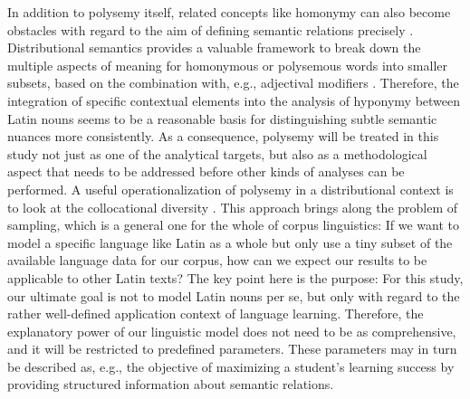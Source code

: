 \documentclass[runningheads]{llncs}
\begin{document}
In addition to polysemy itself, related concepts like homonymy can also become obstacles with regard to the aim of defining semantic relations precisely \parencite[251]{gardnerValidatingConstructWord2007}. Distributional semantics provides a valuable framework to break down the multiple aspects of meaning for homonymous or polysemous words into smaller subsets, based on the combination with, e.g., adjectival modifiers \parencite[42]{boledaIntensionalityWasOnly2013}. Therefore, the integration of specific contextual elements into the analysis of hyponymy between Latin nouns seems to be a reasonable basis for distinguishing subtle semantic nuances more consistently. As a consequence, polysemy will be treated in this study not just as one of the analytical targets, but also as a methodological aspect that needs to be addressed before other kinds of analyses can be performed. A useful operationalization of polysemy in a distributional context is to look at the collocational diversity \parencite[8]{hamiltonDiachronicWordEmbeddings2016}. This approach brings along the problem of sampling, which is a general one for the whole of corpus linguistics: If we want to model a specific language like Latin as a whole but only use a tiny subset of the available language data for our corpus, how can we expect our results to be applicable to other Latin texts? The key point here is the purpose: For this study, our ultimate goal is not to model Latin nouns per se, but only with regard to the rather well-defined application context of language learning. Therefore, the explanatory power of our linguistic model does not need to be as comprehensive, and it will be restricted to predefined parameters. These parameters may in turn be described as, e.g., the objective of maximizing a student's learning success by providing structured information about semantic relations.

\end{document}
